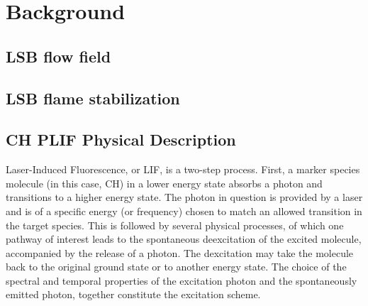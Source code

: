 \chapter{Background}






\section{LSB flow field}

\section{LSB flame stabilization}

\section{CH PLIF Physical Description}

Laser-Induced Fluorescence, or LIF, is a two-step process.
First, a marker species molecule (in this case, CH) in a lower energy state absorbs a photon and transitions to a higher energy state.
The photon in question is provided by a laser and is of a specific energy (or frequency) chosen to match an allowed transition in the target species.
This is followed by several physical processes, of which one pathway of interest leads to the spontaneous deexcitation of the excited molecule, accompanied by the release of a photon.
The dexcitation may take the molecule back to the original ground state or to another energy state.
The choice of the spectral and temporal properties of the excitation photon and the spontaneously emitted photon, together constitute the excitation scheme.

